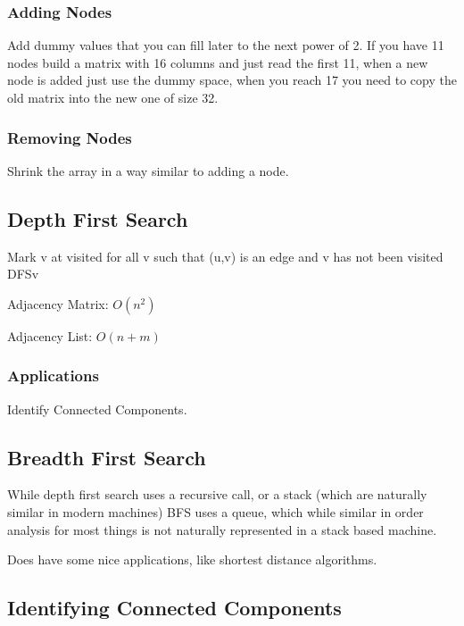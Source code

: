 \documentclass[english, 10pt]{article}
\begin{document}
\subsubsection{Adding Nodes}
Add dummy values that you can fill later to the next power of 2. If you have 11
nodes build a matrix with 16 columns and just read the first 11, when a new
node is added just use the dummy space, when you reach 17 you need to copy the
old matrix into the new one of size 32.

\subsubsection{Removing Nodes}

Shrink the array in a way similar to adding a node.

\subsection{Depth First Search}

\begin{algorithm}
    Mark v at visited\;
    for all v such that (u,v) is an edge and v has not been visited \;
    DFS{v}\;
\end{algorithm}

Adjacency Matrix: $O(n^2)$

Adjacency List: $O(n+m)$

\subsubsection{Applications}
    Identify Connected Components.

\subsection{Breadth First Search}

    While depth first search uses a recursive call, or a stack (which are
    naturally similar in modern machines) BFS uses a queue, which while similar
    in order analysis for most things is not naturally represented in a stack
    based machine.

    Does have some nice applications, like shortest distance algorithms.

\subsection{Identifying Connected Components}
\end{document}
